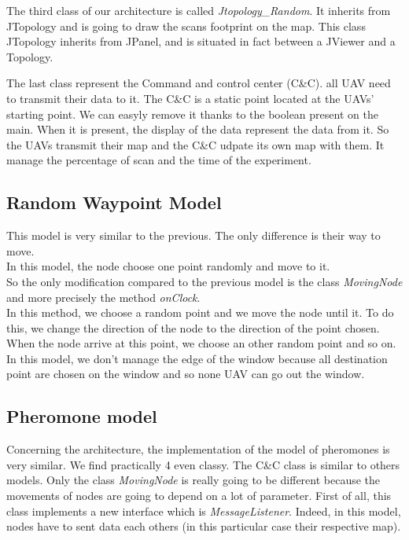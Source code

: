 The third class of our architecture is called \textit{Jtopology\_Random}. It inherits from JTopology and is going to draw the scans footprint on the map. This class JTopology inherits from JPanel, and is situated in fact between a JViewer and a Topology.

The last class represent the Command and control center (C\&C). all UAV need to transmit their data to it. The C\&C is a static point located at the UAVs' starting point. We can easyly remove it thanks to the boolean present on the main. When it is present, the display of the data represent the data from it. So the UAVs transmit their map and the C\&C udpate its own map with them. It manage the percentage of scan and the time of the experiment.


\subsection{Random Waypoint Model}

This model is very similar to the previous. The only difference is their way to move.\\
In this model, the node choose one point randomly and move to it.\\
So the only modification compared to the previous model is the class \textit{MovingNode} and more precisely the method \textit{onClock}.\\
In this method, we choose a random point and we move the node until it. To do this, we change the direction of the node to the direction of the point chosen. When the node arrive at this point, we choose an other random point and so on.\\
In this model, we don't manage the edge of the window because all destination point are chosen on the window and so none UAV can go out the window.

\subsection{Pheromone model}

Concerning the architecture, the implementation of the model of pheromones is very similar. We find practically 4 even classy. The C\&C class is similar to others models. Only the class \textit{MovingNode} is really going to be different because the movements of nodes are going to depend on a lot of parameter. First of all, this class implements a new interface which is \textit{MessageListener}. Indeed, in this model, nodes have to sent data each others (in this particular case their respective map).\\

